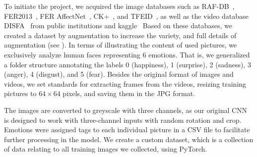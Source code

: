 \begin{table}[ht]
  \centering
\caption{Overview of the image statistics for each emotion class}
\label{tab:emotion}
\end{table}

To initiate the project,  
we acquired the image databases such as RAF-DB~\cite{li_reliable_2017,li2019reliable}, 
FER2013~\cite{BarsoumZCZ16}, FER AffectNet~\cite{Mollah2019ANet}, 
CK+~\cite{LuceyCKSAM10}, and TFEID~\cite{tfeid,LiGL22}, 
as well as the video database DISFA~\cite{MavadatiMBTC13} from public institutions and kaggle~\cite{kaggle_rafdb,kagaff}
Based on these databases, we created a dataset by augmentation to increase the variety, 
and full details of augmentation (see ). 
In terms of illustrating the content of used pictures, we exclusively analyze human faces representing 6 emotions. 
That is, 
we generalized a folder structure annotating the labels 0 (happiness), 1 (surprise), 2 (sadness), 3 (anger), 4 (disgust), and 5 (fear). 
Besides the original format of images and videos, we set standards for extracting frames from the videos, 
resizing training pictures to $64\times 64$ pixels, and saving them in the JPG format.

The images are converted to greyscale with three channels, 
as our original CNN is designed to work with three-channel inputs with random rotation and crop. 
Emotions were assigned tags to each individual picture in a CSV file to facilitate further processing in the model.
We create a custom dataset, which is a collection of data relating to all training images we collected, 
using PyTorch.


